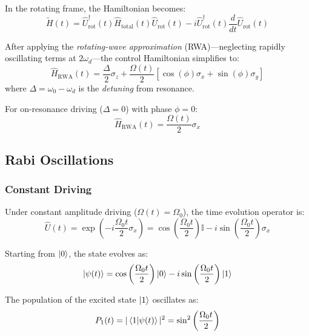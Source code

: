 \documentclass[11pt,a4paper]{article}
\theoremstyle{definition}
\theoremstyle{remark}
\begin{document}
In the rotating frame, the Hamiltonian becomes:
\begin{equation}
\tilde{H}(t) = \hat{U}_{\text{rot}}^\dagger(t) \hat{H}_{\text{total}}(t) \hat{U}_{\text{rot}}(t) - i \hat{U}_{\text{rot}}^\dagger(t) \frac{d}{dt}\hat{U}_{\text{rot}}(t)
\end{equation}

After applying the \emph{rotating-wave approximation} (RWA)---neglecting rapidly oscillating terms at $2\omega_d$---the control Hamiltonian simplifies to:
\begin{equation}
\hat{H}_{\text{RWA}}(t) = \frac{\Delta}{2} \sigma_z + \frac{\Omega(t)}{2} \left[\cos(\phi) \sigma_x + \sin(\phi) \sigma_y\right]
\label{eq:control_rwa}
\end{equation}
where $\Delta = \omega_0 - \omega_d$ is the \emph{detuning} from resonance.

For on-resonance driving ($\Delta = 0$) with phase $\phi = 0$:
\begin{equation}
\hat{H}_{\text{RWA}}(t) = \frac{\Omega(t)}{2} \sigma_x
\end{equation}

\subsection{Rabi Oscillations}

\subsubsection{Constant Driving}

Under constant amplitude driving ($\Omega(t) = \Omega_0$), the time evolution operator is:
\begin{equation}
\hat{U}(t) = \exp\left(-i \frac{\Omega_0 t}{2} \sigma_x\right) = \cos\left(\frac{\Omega_0 t}{2}\right) \mathbb{I} - i \sin\left(\frac{\Omega_0 t}{2}\right) \sigma_x
\end{equation}

Starting from $\ket{0}$, the state evolves as:
\begin{equation}
\ket{\psi(t)} = \cos\left(\frac{\Omega_0 t}{2}\right) \ket{0} - i \sin\left(\frac{\Omega_0 t}{2}\right) \ket{1}
\end{equation}

The population of the excited state $\ket{1}$ oscillates as:
\begin{equation}
P_1(t) = |\braket{1}{\psi(t)}|^2 = \sin^2\left(\frac{\Omega_0 t}{2}\right)
\end{equation}
\end{document}
